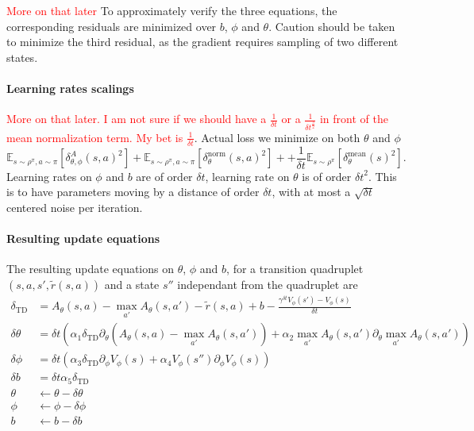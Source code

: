 \documentclass[11pt]{article}
\newcommand{\deltat}{{\delta t}}
\newcommand{\E}{\mathbb{E}}
\newcommand{\TODO}[1]{\textcolor{red}{#1}}
\newcommand{\tdres}{\delta_\text{TD}}
\begin{document}
\TODO{More on that later}
To approximately verify the three equations, the corresponding residuals are
minimized over $b$, $\phi$ and $\theta$. Caution should be taken to minimize
the third residual, as the gradient requires sampling of two different states.

\paragraph{Learning rates scalings}
\TODO{More on that later. I am not sure if we should have a $\frac{1}{\deltat}$
	or a $\frac{1}{\deltat^\frac{3}{2}}$ in front of the mean normalization
term. My bet is $\frac{1}{\deltat}$}.
Actual loss we minimize on both $\theta$ and $\phi$
\begin{equation}
	\E_{s \sim \rho^\pi, a \sim \pi}\left[\delta^A_{\theta, \phi}(s, a)^2\right] +
	\E_{s \sim \rho^\pi, a \sim \pi}\left[\delta^\text{norm}_{\theta}(s, a)^2\right] +
	+ \frac{1}{\deltat}\E_{s \sim \rho^\pi}\left[\delta^\text{mean}_{\theta}(s)^2\right].
\end{equation}
Learning rates on $\phi$ and $b$ are of order $\deltat$, learning rate on
$\theta$ is of order $\deltat^2$. This is to have parameters moving by a
distance of order $\deltat$, with at most a $\sqrt{\deltat}$ centered noise per
iteration.

\paragraph{Resulting update equations}
The resulting update equations on $\theta$, $\phi$ and $b$, for a transition
quadruplet $(s, a, s', \tilde{r}(s, a))$ and a state $s''$ independant from the
quadruplet are
\begin{align}
	\tdres &= A_\theta(s, a) - 
	\max\limits_{a'} A_\theta(s, a')-
	\tilde{r}(s, a) + b - \frac{\gamma^\deltat V_\phi(s') - V_\phi(s)}{\deltat}\\
	\delta \theta &= \deltat \left(\alpha_1 \tdres \partial_\theta \left(A_\theta(s, a) - 
		\max\limits_{a'} A_\theta(s, a')\right)
	+ \alpha_2 \max\limits_{a'} A_\theta(s, a')\partial_\theta \max\limits_{a'} A_\theta(s, a')\right)\\
	\delta \phi &= \deltat \left( \alpha_3 \tdres \partial_\phi V_\phi(s) + \alpha_4 V_\phi(s'')\partial_\phi V_\phi(s)\right)\\
	\delta b &= \deltat \alpha_5 \tdres\\
	\theta &\leftarrow \theta - \delta \theta\\
	\phi &\leftarrow \phi - \delta \phi\\
	b &\leftarrow b - \delta b\\
\end{align}
\end{document}
